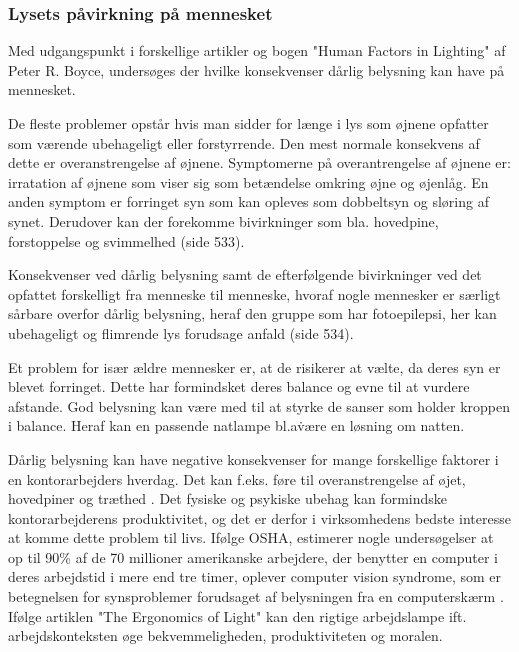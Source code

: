 \subsubsection{Lysets påvirkning på mennesket} 
\label{sec:konsekvenser}

Med udgangspunkt i forskellige artikler og bogen "Human Factors in Lighting" af Peter R. Boyce, undersøges der hvilke konsekvenser dårlig belysning kan have på mennesket. 

De fleste problemer opstår hvis man sidder for længe i lys som øjnene opfatter som værende ubehageligt eller forstyrrende. Den mest normale konsekvens af dette er overanstrengelse af øjnene. Symptomerne på overantrengelse af øjnene er: irratation af øjnene som viser sig som betændelse omkring øjne og øjenlåg. En anden symptom er forringet syn som kan opleves som dobbeltsyn og sløring af synet. Derudover kan der forekomme bivirkninger som bla. hovedpine, forstoppelse og svimmelhed \cite{human_factors}(side 533).

Konsekvenser ved dårlig belysning samt de efterfølgende bivirkninger ved det opfattet forskelligt fra menneske til menneske, hvoraf nogle mennesker er særligt sårbare overfor dårlig belysning, heraf den gruppe som har fotoepilepsi, her kan ubehageligt og flimrende lys forudsage anfald \cite{human_factors}(side 534). 

Et problem for især ældre mennesker er, at de risikerer at vælte, da deres syn er blevet forringet. Dette har formindsket deres balance og evne til at vurdere afstande. God belysning kan være med til at styrke de sanser som holder kroppen i balance. Heraf kan en passende natlampe bl.a\. være en løsning om natten\cite{human_factors}. 

Dårlig belysning kan have negative konsekvenser for mange forskellige faktorer i en kontorarbejders hverdag. Det kan f.eks. føre til overanstrengelse af øjet, hovedpiner og træthed \cite{ergonomi_arbejdsplads}. Det fysiske og psykiske ubehag kan formindske kontorarbejderens produktivitet, og det er derfor i virksomhedens bedste interesse at komme dette problem til livs. Ifølge OSHA, estimerer nogle undersøgelser at op til 90\% af de 70 millioner amerikanske arbejdere, der benytter en computer i deres arbejdstid i mere end tre timer, oplever computer vision syndrome, som er betegnelsen for synsproblemer forudsaget af belysningen fra en computerskærm \cite{CVS}. Ifølge artiklen "The Ergonomics of Light" kan den rigtige arbejdslampe ift. arbejdskonteksten øge bekvemmeligheden, produktiviteten og moralen\cite{ergonomi_arbejdsplads}. 